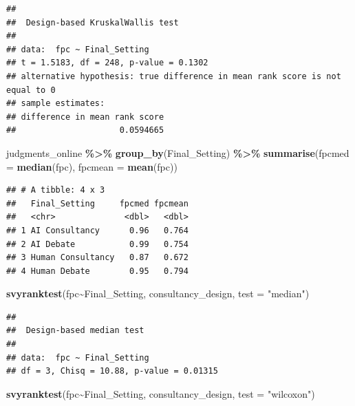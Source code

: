\documentclass[
]{article}
\newenvironment{Shaded}{\begin{snugshade}}{\end{snugshade}}
\newcommand{\AttributeTok}[1]{\textcolor[rgb]{0.13,0.29,0.53}{#1}}
\newcommand{\FunctionTok}[1]{\textcolor[rgb]{0.13,0.29,0.53}{\textbf{#1}}}
\newcommand{\NormalTok}[1]{#1}
\newcommand{\SpecialCharTok}[1]{\textcolor[rgb]{0.81,0.36,0.00}{\textbf{#1}}}
\newcommand{\StringTok}[1]{\textcolor[rgb]{0.31,0.60,0.02}{#1}}
\begin{document}
\begin{verbatim}
## 
##  Design-based KruskalWallis test
## 
## data:  fpc ~ Final_Setting
## t = 1.5183, df = 248, p-value = 0.1302
## alternative hypothesis: true difference in mean rank score is not equal to 0
## sample estimates:
## difference in mean rank score 
##                     0.0594665
\end{verbatim}

\begin{Shaded}
\begin{Highlighting}[]
\NormalTok{judgments\_online }\SpecialCharTok{\%\textgreater{}\%} \FunctionTok{group\_by}\NormalTok{(Final\_Setting) }\SpecialCharTok{\%\textgreater{}\%} \FunctionTok{summarise}\NormalTok{(}\AttributeTok{fpcmed =} \FunctionTok{median}\NormalTok{(fpc),}
                                                           \AttributeTok{fpcmean =} \FunctionTok{mean}\NormalTok{(fpc))}
\end{Highlighting}
\end{Shaded}

\begin{verbatim}
## # A tibble: 4 x 3
##   Final_Setting     fpcmed fpcmean
##   <chr>              <dbl>   <dbl>
## 1 AI Consultancy      0.96   0.764
## 2 AI Debate           0.99   0.754
## 3 Human Consultancy   0.87   0.672
## 4 Human Debate        0.95   0.794
\end{verbatim}

\begin{Shaded}
\begin{Highlighting}[]
\FunctionTok{svyranktest}\NormalTok{(fpc}\SpecialCharTok{\textasciitilde{}}\NormalTok{Final\_Setting, consultancy\_design, }\AttributeTok{test =} \StringTok{"median"}\NormalTok{)}
\end{Highlighting}
\end{Shaded}

\begin{verbatim}
## 
##  Design-based median test
## 
## data:  fpc ~ Final_Setting
## df = 3, Chisq = 10.88, p-value = 0.01315
\end{verbatim}

\begin{Shaded}
\begin{Highlighting}[]
\FunctionTok{svyranktest}\NormalTok{(fpc}\SpecialCharTok{\textasciitilde{}}\NormalTok{Final\_Setting, consultancy\_design, }\AttributeTok{test =} \StringTok{"wilcoxon"}\NormalTok{)}
\end{Highlighting}
\end{Shaded}
\end{document}
